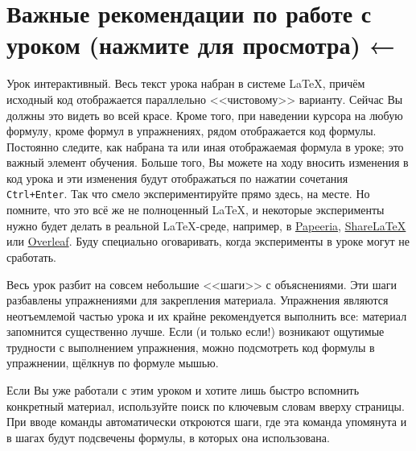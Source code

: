 \section{Важные рекомендации по работе с уроком (нажмите для просмотра) ←}
\par Урок интерактивный. Весь текст урока набран в системе \LaTeX, причём исходный код отображается параллельно <<чистовому>> варианту. Сейчас Вы должны это видеть во всей красе. Кроме того, при наведении курсора на любую формулу, кроме формул в упражнениях, рядом отображается код формулы. Постоянно следите, как набрана та или иная отображаемая формула в уроке; это важный элемент обучения. Больше того, Вы можете на ходу вносить изменения в код урока и эти изменения будут отображаться по нажатии сочетания \verb"Ctrl+Enter". Так что смело экспериментируйте прямо здесь, на месте. Но помните, что это всё же не полноценный \LaTeX, и некоторые эксперименты нужно будет делать в реальной \LaTeX-среде, например, в \href{https://papeeria.com/landing}{Papeeria}, \href{https://www.sharelatex.com/}{ShareLaTeX} или \href{https://www.overleaf.com/index_b}{Overleaf}. Буду специально оговаривать, когда эксперименты в уроке могут не сработать.
\par Весь урок разбит на совсем небольшие <<шаги>> с объяснениями. Эти шаги разбавлены упражнениями для закрепления материала. Упражнения являются неотъемлемой частью урока и их крайне рекомендуется выполнить все: материал запомнится существенно лучше. Если (и только если!) возникают ощутимые трудности с выполнением упражнения, можно подсмотреть код формулы в упражнении, щёлкнув по формуле мышью.
\par Если Вы уже работали с этим уроком и хотите лишь быстро вспомнить конкретный материал, используйте поиск по ключевым словам вверху страницы. При вводе команды автоматически откроются шаги, где эта команда упомянута и в шагах будут подсвечены формулы, в которых она использована.